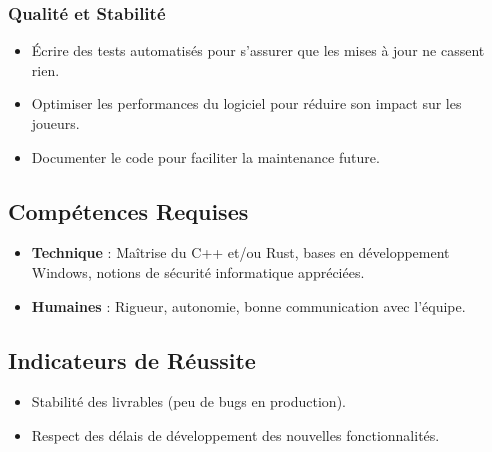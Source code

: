 \documentclass[12pt,a4paper]{article}
\begin{document}
\subsubsection{Qualité et Stabilité}
\begin{itemize}[label=\textbullet]
    \item Écrire des tests automatisés pour s'assurer que les mises à jour ne cassent rien.
    \item Optimiser les performances du logiciel pour réduire son impact sur les joueurs.
    \item Documenter le code pour faciliter la maintenance future.
\end{itemize}

\subsection{Compétences Requises}
\begin{itemize}[label=\textbullet]
    \item \textbf{Technique} : Maîtrise du C++ et/ou Rust, bases en développement Windows, notions de sécurité informatique appréciées.
    \item \textbf{Humaines} : Rigueur, autonomie, bonne communication avec l'équipe.
\end{itemize}

\subsection{Indicateurs de Réussite}
\begin{itemize}[label=\textbullet]
    \item Stabilité des livrables (peu de bugs en production).
    \item Respect des délais de développement des nouvelles fonctionnalités.
\end{itemize}
\end{document}
